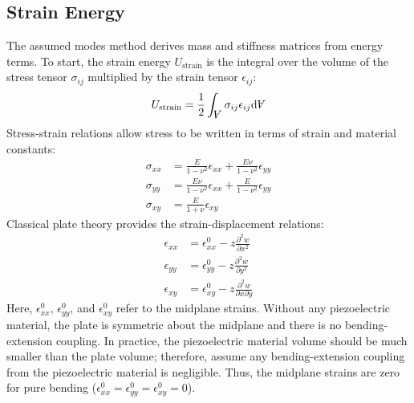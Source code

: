 \documentclass[thesis]{fputhesis}
\newcommand{\Vol}{\rotatebox[origin=c]{180}{\ensuremath{A}}}
\begin{document}
\begin{body}
\begin{appendices}
\subsection{Strain Energy}
The assumed modes method derives mass and stiffness matrices from energy terms. To start, the strain energy $U_{\text{strain}}$ is the integral over the volume of the stress tensor $\sigma_{ij}$ multiplied by the strain tensor $\epsilon_{ij}$:
\begin{equation}
U_{\text{strain}}=\frac{1}{2}\int_{\Vol} \sigma_{ij} \epsilon_{ij} \text{d}\Vol
\end{equation}
Stress-strain relations allow stress to be written in terms of strain and material constants:
\begin{align}
\sigma_{xx}&=\frac{E}{1-\nu^2} \epsilon_{xx}+\frac{E\nu}{1-\nu^2}\epsilon_{yy} \\
\sigma_{yy}&=\frac{E\nu}{1-\nu^2} \epsilon_{xx}+\frac{E}{1-\nu^2}\epsilon_{yy} \\
\sigma_{xy}&=\frac{E}{1+\nu} \epsilon_{xy}
\end{align}
Classical plate theory provides the strain-displacement relations:
\begin{align}
\epsilon_{xx}&=\epsilon_{xx}^0-z\frac{\partial^2 w}{\partial x^2} \\
\epsilon_{yy}&=\epsilon_{yy}^0-z\frac{\partial^2 w}{\partial y^2} \\
\epsilon_{xy}&=\epsilon_{xy}^0-z\frac{\partial^2 w}{\partial x \partial y}
\end{align}
Here, $\epsilon_{xx}^0$, $\epsilon_{yy}^0$, and $\epsilon_{xy}^0$ refer to the midplane strains. Without any piezoelectric material, the plate is symmetric about the midplane and there is no bending-extension coupling. In practice, the piezoelectric material volume should be much smaller than the plate volume; therefore, assume any bending-extension coupling from the piezoelectric material is negligible. Thus, the midplane strains are zero for pure bending ($\epsilon_{xx}^0=\epsilon_{yy}^0=\epsilon_{xy}^0=0$).


\end{appendices}
\end{body}
\end{document}
